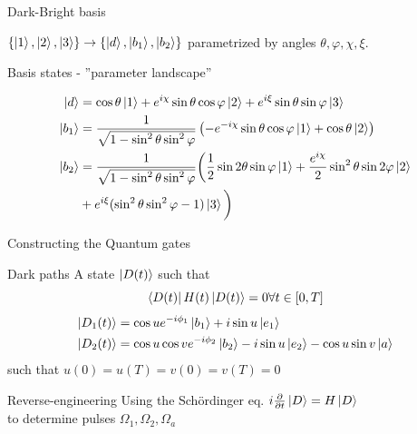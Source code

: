 \documentclass[t]{beamer}
\begin{document}
\begin{frame}{Dark-Bright basis}

\begin{block}


 $\{\ket{1},\ket{2},\ket{3}\} \rightarrow \{\ket{d},\ket{b_1},\ket{b_2}\}$ 
parametrized by angles $\theta,\varphi,\chi,\xi$.


\end{block}

\begin{block}{Basis states - ''parameter landscape''}

\begin{equation}
\begin{aligned}
\ket{d} &= \cos\theta\ket{1} + e^{i\chi}\sin\theta\cos\varphi\ket{2} + e^{i\xi}\sin\theta\sin\varphi\ket{3}
\\
\ket{b_1} &= \frac{1}{\sqrt{1-\sin^2\theta\sin^2\varphi}} \left(-e^{-i\chi}\sin\theta\cos\varphi\ket{1} + \cos\theta\ket{2} \right)
\\
\ket{b_2} &= \frac{1}{\sqrt{1-\sin^2\theta\sin^2\varphi}} \bigg(\frac{1}{2}\sin 2\theta\sin\varphi\ket{1} + \dfrac{e^{i\chi}}{2}\sin^2\theta\sin 2\varphi\ket{2} \\&+ e^{i\xi}(\sin^2\theta\sin^2\varphi - 1)\ket{3}\bigg)
\end{aligned}
\end{equation}

\end{block}
\end{frame}

\begin{frame}{Constructing the Quantum gates}

\begin{block}{Dark paths}\footnotesize
A state $\ket{D(t)}$ such that 
\begin{equation}
    \bra{D(t)}H(t)\ket{D(t)} = 0 \forall t\in [0,T]
\end{equation}
\begin{equation}
\begin{aligned}
\ket{D_1(t)} &= \cos u e^{-i\phi_1}\ket{b_1} + i\sin u \ket{e_1}
\\
\ket{D_2(t)} &= \cos u\cos v e^{-i\phi_2}\ket{b_2} - i\sin u \ket{e_2} - \cos u\sin v \ket{a}
\end{aligned}
\end{equation}
such that $u(0) = u(T) = v(0) = v(T) = 0$

\end{block} 

\begin{block}{Reverse-engineering}
Using the Schördinger eq. $i\pdv{}{t}\ket{D} = H\ket{D}$
\\
to determine pulses $\Omega_1, \Omega_2, \Omega_a$

\end{block}



\end{frame}
\end{document}

